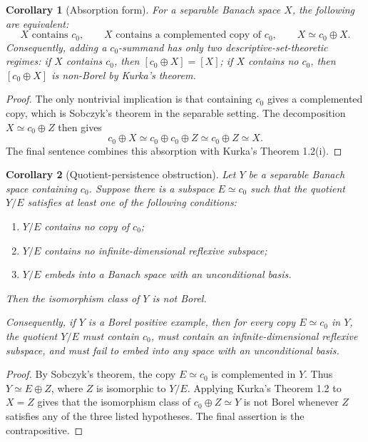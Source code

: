 \documentclass[11pt]{article}
\newtheorem*{corollary}{Corollary}
\begin{document}
\begin{corollary}[Absorption form]
For a separable Banach space \(X\), the following are equivalent:
\[
  X\text{ contains }c_0,\qquad
  X\text{ contains a complemented copy of }c_0,\qquad
  X\simeq c_0\oplus X.
\]
Consequently, adding a \(c_0\)-summand has only two descriptive-set-theoretic
regimes: if \(X\) contains \(c_0\), then \([c_0\oplus X]=[X]\); if \(X\)
contains no \(c_0\), then \([c_0\oplus X]\) is non-Borel by Kurka's theorem.
\end{corollary}

\begin{proof}
The only nontrivial implication is that containing \(c_0\) gives a complemented
copy, which is Sobczyk's theorem in the separable setting.  The decomposition
\(X\simeq c_0\oplus Z\) then gives
\[
  c_0\oplus X\simeq c_0\oplus c_0\oplus Z\simeq c_0\oplus Z\simeq X.
\]
The final sentence combines this absorption with Kurka's Theorem 1.2(i).
\end{proof}

\begin{corollary}[Quotient-persistence obstruction]
Let \(Y\) be a separable Banach space containing \(c_0\).  Suppose there is a
subspace \(E\simeq c_0\) such that the quotient \(Y/E\) satisfies at least one
of the following conditions:
\begin{enumerate}
\item \(Y/E\) contains no copy of \(c_0\);
\item \(Y/E\) contains no infinite-dimensional reflexive subspace;
\item \(Y/E\) embeds into a Banach space with an unconditional basis.
\end{enumerate}
Then the isomorphism class of \(Y\) is not Borel.

Consequently, if \(Y\) is a Borel positive example, then for every copy
\(E\simeq c_0\) in \(Y\), the quotient \(Y/E\) must contain \(c_0\), must
contain an infinite-dimensional reflexive subspace, and must fail to embed into
any space with an unconditional basis.
\end{corollary}

\begin{proof}
By Sobczyk's theorem, the copy \(E\simeq c_0\) is complemented in \(Y\).  Thus
\(Y\simeq E\oplus Z\), where \(Z\) is isomorphic to \(Y/E\).  Applying Kurka's
Theorem 1.2 to \(X=Z\) gives that the isomorphism class of
\(c_0\oplus Z\simeq Y\) is not Borel whenever \(Z\) satisfies any of the three
listed hypotheses.  The final assertion is the contrapositive.
\end{proof}
\end{document}
